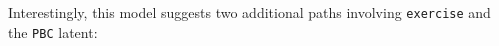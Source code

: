 \documentclass[]{article}
\newenvironment{Shaded}{\begin{snugshade}}{\end{snugshade}}
\newcommand{\KeywordTok}[1]{\textcolor[rgb]{0.13,0.29,0.53}{\textbf{#1}}}
\newcommand{\StringTok}[1]{\textcolor[rgb]{0.31,0.60,0.02}{#1}}
\newcommand{\OperatorTok}[1]{\textcolor[rgb]{0.81,0.36,0.00}{\textbf{#1}}}
\newcommand{\NormalTok}[1]{#1}
\theoremstyle{definition}
\theoremstyle{definition}
\theoremstyle{definition}
\theoremstyle{remark}
\begin{document}
Interestingly, this model suggests two additional paths involving
\texttt{exercise} and the \texttt{PBC} latent:

\begin{Shaded}
\end{Shaded}
\end{document}
